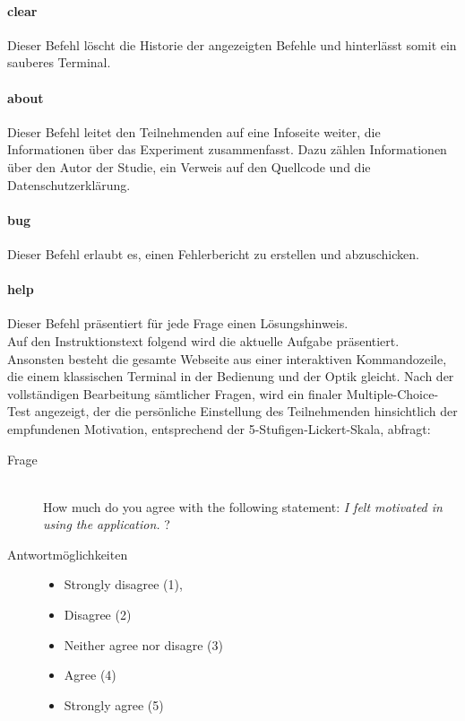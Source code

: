 \paragraph{clear}
Dieser Befehl löscht die Historie der angezeigten Befehle und hinterlässt somit ein sauberes Terminal.

\paragraph{about}
Dieser Befehl leitet den Teilnehmenden auf eine Infoseite weiter, die Informationen über das Experiment zusammenfasst. Dazu zählen Informationen über den Autor der Studie, ein Verweis auf den Quellcode und die Datenschutzerklärung.

\paragraph{bug}
Dieser Befehl erlaubt es, einen Fehlerbericht zu erstellen und abzuschicken.

\paragraph{help}
Dieser Befehl präsentiert für jede Frage einen Lösungshinweis. \\

Auf den Instruktionstext folgend wird die aktuelle Aufgabe präsentiert. Ansonsten besteht die gesamte Webseite aus einer interaktiven Kommandozeile, die einem klassischen Terminal in der Bedienung und der Optik gleicht. Nach der vollständigen Bearbeitung sämtlicher Fragen, wird ein finaler Multiple-Choice-Test angezeigt, der die persönliche Einstellung des Teilnehmenden hinsichtlich der empfundenen Motivation, entsprechend der 5-Stufigen-Lickert-Skala, abfragt:

\begin{description}
\item[Frage]\hfill \\ How much do you agree with the following statement: \textit{I felt motivated in using the application.} ?
\item[Antwortmöglichkeiten]\hfill 


\begin{itemize}
	 \item Strongly disagree (1),
	 \item Disagree (2)
	 \item Neither agree nor disagre (3)
	 \item Agree (4)
	 \item Strongly agree (5)
\end{itemize}
\end{description}


